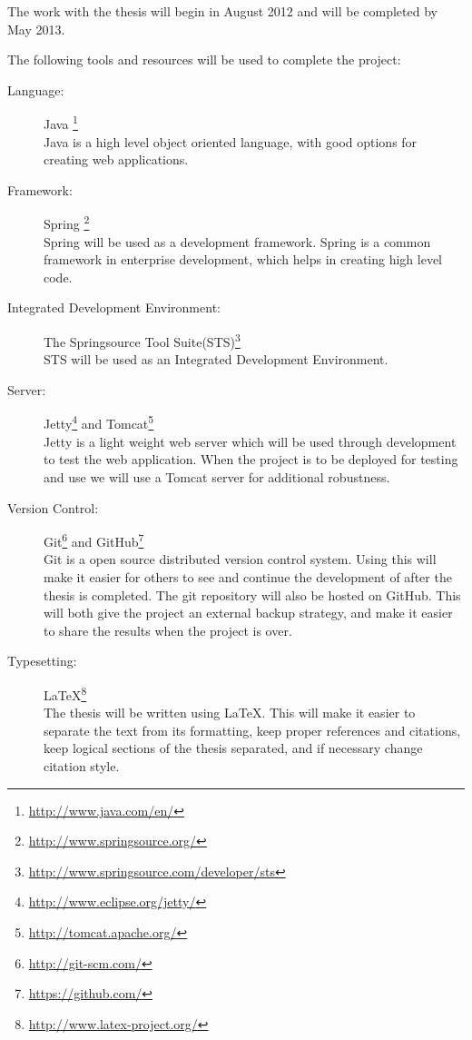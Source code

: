 The work with the thesis will begin in August 2012 and will be completed by May 2013.


The following tools and resources will be used to complete the project:

\begin{description}
    \item[Language: ] Java \footnote{\url{http://www.java.com/en/}} 
    \\ Java is a high level object oriented language, with good options for creating web applications.
    \item[Framework: ] Spring \footnote{\url{http://www.springsource.org/}} 
    \\ Spring will be used as a development framework. Spring is a common framework in enterprise development, which helps in creating high level code.
    \item[Integrated Development Environment: ] The Springsource Tool Suite(STS)\footnote{\url{http://www.springsource.com/developer/sts}} 
    \\ STS will be used as an Integrated Development Environment.
    \item[Server: ] Jetty\footnote{\url{http://www.eclipse.org/jetty/}} and Tomcat\footnote{\url{http://tomcat.apache.org/}} 
    \\ Jetty is a light weight web server which will be used through development to test the web application. When the project is to be deployed for testing and use we will use a Tomcat server for additional robustness.
    \item[Version Control: ] Git\footnote{\url{http://git-scm.com/}} and GitHub\footnote{\url{https://github.com/}} 
    \\ Git is a open source distributed version control system. Using this will make it easier for others to see and continue the development of \theartefact after the thesis is completed. The git repository will also be hosted on GitHub. This will both give the project an external backup strategy, and make it easier to share the results when the project is over.
    \item[Typesetting: ] \LaTeX{}\footnote{\url{http://www.latex-project.org/}}
    \\ The thesis will be written using \LaTeX{}. This will make it easier to separate the text from its formatting, keep proper references and citations, keep logical sections of the thesis separated, and if necessary change citation style.
\end{description}

